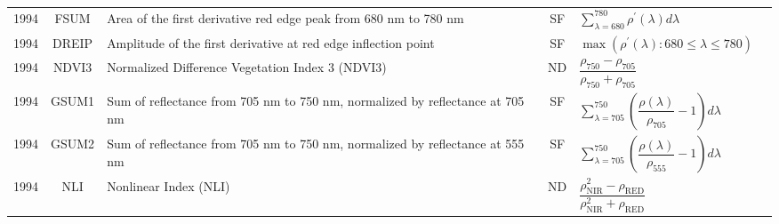 \documentclass[10pt]{article}
\begin{document}
\begin{ThreePartTable}
\begin{longtable}{c c m{2.3in} c M{2.8in} M{1.5in}}
  1994 & FSUM    & Area of the first derivative red edge peak from 680 nm to 780 nm               & SF & $\sum\limits_{\lambda=680}^{780}\rho^\prime(\lambda)d\lambda$                                                                                                                                                                                                                           & \citet{Filella1994,Filella1995}                     \\
  1994 & DREIP   & Amplitude of the first derivative at red edge inflection point                 & SF & $\max(\rho^\prime(\lambda) : 680\le\lambda\le780)$                                                                                                                                                                                                                                      & \citet{Filella1994,Filella1995}                     \\
  1994 & NDVI3   & Normalized Difference Vegetation Index 3 (NDVI3)                               & ND & $\dfrac{\rho_{750}-\rho_{705}}{\rho_{750}+\rho_{705}}$                                                                                                                                                                                                                                  & \citet{Gitelson1994}                                \\
  1994 & GSUM1   & Sum of reflectance from 705 nm to 750 nm, normalized by reflectance at 705 nm  & SF & $\sum\limits_{\lambda=705}^{750}\left(\dfrac{\rho(\lambda)}{\rho_{705}}-1\right)d\lambda$                                                                                                                                                                                               & \citet{Gitelson1994}                                \\
  1994 & GSUM2   & Sum of reflectance from 705 nm to 750 nm, normalized by reflectance at 555 nm  & SF & $\sum\limits_{\lambda=705}^{750}\left(\dfrac{\rho(\lambda)}{\rho_{555}}-1\right)d\lambda$                                                                                                                                                                                               & \citet{Gitelson1994}                                \\
  1994 & NLI     & Nonlinear Index (NLI)                                                          & ND & $\dfrac{\rho_\text{NIR}^2-\rho_\text{RED}}{\rho_\text{NIR}^2+\rho_\text{RED}}$                                                                                                                                                                                                          & \citet{Goel1994}                                    \\

\end{longtable}
\end{ThreePartTable}
\end{document}
